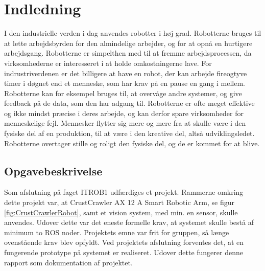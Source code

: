 \chapter{Indledning}\label{chap:Indledning}
I den industrielle verden i dag anvendes robotter i høj grad.
Robotterne bruges til at lette arbejdsbyrden for den almindelige arbejder, og for at opnå en hurtigere arbejdsgang.
Robotterne er simpelthen med til at fremme arbejdsprocessen, da virksomhederne er interesseret i at holde omkostningerne lave.
For indrustriverdenen er det billigere at have en robot, der kan arbejde fireogtyve timer i døgnet end et menneske, som har krav på en pause en gang i mellem.
Robotterne kan for eksempel bruges til, at overvåge andre systemer, og give feedback på de data, som den har adgang til.
Robotterne er ofte meget effektive og ikke mindst præcise i deres arbejde, og kan derfor spare virksomheder for menneskelige fejl.
Mennesker flytter sig mere og mere fra at skulle være i den fysiske del af en produktion, til at være i den kreative del, altså udviklingsledet.
Robotterne overtager stille og roligt den fysiske del, og de er kommet for at blive.

\section{Opgavebeskrivelse}\label{sec:Opgavebeskrivelse}
Som afslutning på faget ITROB1 udfærdiges et projekt.
Rammerne omkring dette projekt var, at CrustCrawler AX 12 A Smart Robotic Arm, se figur \ref{fig:CrustCrawlerRobot}, samt et vision system, med min. en sensor, skulle anvendes. Udover dette var det eneste formelle krav, at systemet skulle bestå af minimum to ROS noder. 
Projektets emne var frit for gruppen, så længe ovenstående krav blev opfyldt. 
Ved projektets afslutning forventes det, at en fungerende prototype på systemet er realiseret.
Udover dette fungerer denne rapport som dokumentation af projektet.
